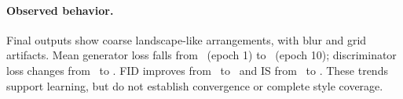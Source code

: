 \paragraph{Observed behavior.}
Final outputs show coarse landscape-like arrangements, with blur and grid
artifacts. Mean generator loss falls from \FirstGLoss\ (epoch 1) to
\FinalGLoss\ (epoch 10); discriminator loss changes from \FirstDLoss\ to
\FinalDLoss. FID improves from \InitialFID\ to \FinalFID\ and IS from
\InitialIS\ to \FinalIS. These trends support learning, but do not establish
convergence or complete style coverage.

